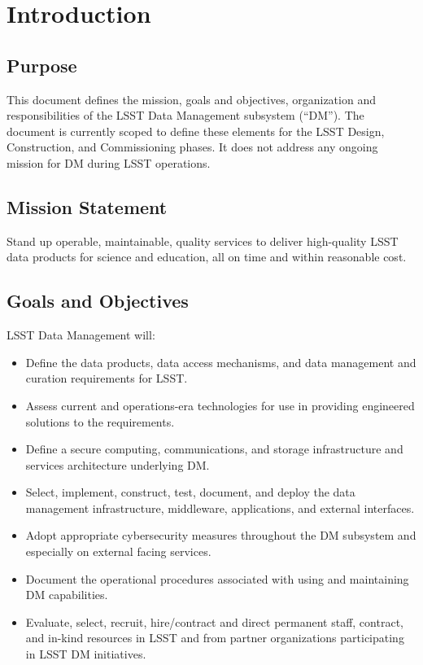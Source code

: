 \section{Introduction}
\subsection{Purpose}
This document defines the mission, goals and objectives, organization and responsibilities of the LSST Data Management subsystem (``DM'').
The document is currently scoped to define these elements for the LSST Design, Construction, and Commissioning phases.
It does not address any ongoing mission for DM during LSST operations.

\subsection{Mission Statement}
Stand up operable, maintainable, quality services to deliver high-quality LSST data products for science and education, all on time and within reasonable cost.

\subsection{Goals and Objectives}
LSST Data Management will:
\begin{itemize}
\item Define the data products, data access mechanisms, and data management and curation requirements for LSST.
\item Assess current and operations-era technologies for use in providing engineered solutions to the requirements.
\item Define a secure computing, communications, and storage infrastructure and services architecture underlying DM.
\item Select, implement, construct, test, document, and deploy the data management infrastructure, middleware, applications, and external interfaces.
\item Adopt appropriate cybersecurity measures throughout the DM subsystem and especially on external facing services.
\item Document the operational procedures associated with using and maintaining DM capabilities.
\item Evaluate, select, recruit, hire/contract and direct permanent staff, contract, and in-kind resources in LSST and from partner organizations participating in LSST DM initiatives.

\end{itemize}

